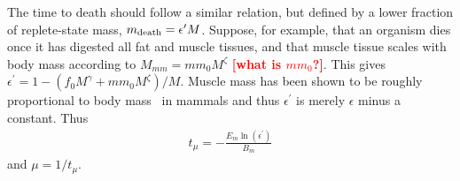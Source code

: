 \documentclass{pnastwo}
\newcommand{\sid}[1]{\textcolor{red}{\bf [#1]}}
\begin{document}
\begin{article}
The time to death should follow a similar relation, but defined by a lower
fraction of replete-state mass, $m_{\rm death}=\epsilon^{\prime} M$.
Suppose, for example, that an organism dies once it has digested all fat and
muscle tissues, and that muscle tissue scales with body mass according to
$M_{mm}=mm_{0}M^{\zeta}$ \sid{what is $mm_0$?}.  This gives
$\epsilon^{\prime}=1-\left(f_{0}M^{\gamma}+mm_{0}M^{\zeta}\right)/M$. Muscle
mass has been shown to be roughly proportional to body mass~\cite{muscle} in
mammals and thus $\epsilon^{\prime}$ is merely $\epsilon$ minus a constant.
Thus
\begin{eqnarray}
t_{\mu}=-\frac{E_{m}\ln\left(\epsilon^{\prime}\right)}{B_{m}}
\end{eqnarray}
and $\mu=1/t_{\mu}$. 



\end{article}
\end{document}
